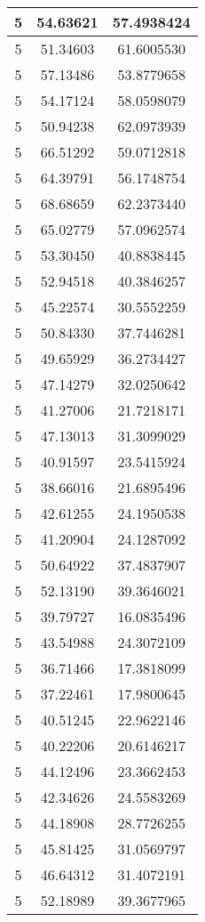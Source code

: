 \documentclass[
]{book}
\begin{document}
\begin{tabular}{c|c|c}
\hline
5 & 54.63621 & 57.4938424\\
\hline
5 & 51.34603 & 61.6005530\\
\hline
5 & 57.13486 & 53.8779658\\
\hline
5 & 54.17124 & 58.0598079\\
\hline
5 & 50.94238 & 62.0973939\\
\hline
5 & 66.51292 & 59.0712818\\
\hline
5 & 64.39791 & 56.1748754\\
\hline
5 & 68.68659 & 62.2373440\\
\hline
5 & 65.02779 & 57.0962574\\
\hline
5 & 53.30450 & 40.8838445\\
\hline
5 & 52.94518 & 40.3846257\\
\hline
5 & 45.22574 & 30.5552259\\
\hline
5 & 50.84330 & 37.7446281\\
\hline
5 & 49.65929 & 36.2734427\\
\hline
5 & 47.14279 & 32.0250642\\
\hline
5 & 41.27006 & 21.7218171\\
\hline
5 & 47.13013 & 31.3099029\\
\hline
5 & 40.91597 & 23.5415924\\
\hline
5 & 38.66016 & 21.6895496\\
\hline
5 & 42.61255 & 24.1950538\\
\hline
5 & 41.20904 & 24.1287092\\
\hline
5 & 50.64922 & 37.4837907\\
\hline
5 & 52.13190 & 39.3646021\\
\hline
5 & 39.79727 & 16.0835496\\
\hline
5 & 43.54988 & 24.3072109\\
\hline
5 & 36.71466 & 17.3818099\\
\hline
5 & 37.22461 & 17.9800645\\
\hline
5 & 40.51245 & 22.9622146\\
\hline
5 & 40.22206 & 20.6146217\\
\hline
5 & 44.12496 & 23.3662453\\
\hline
5 & 42.34626 & 24.5583269\\
\hline
5 & 44.18908 & 28.7726255\\
\hline
5 & 45.81425 & 31.0569797\\
\hline
5 & 46.64312 & 31.4072191\\
\hline
5 & 52.18989 & 39.3677965\\

\end{tabular}
\end{document}
